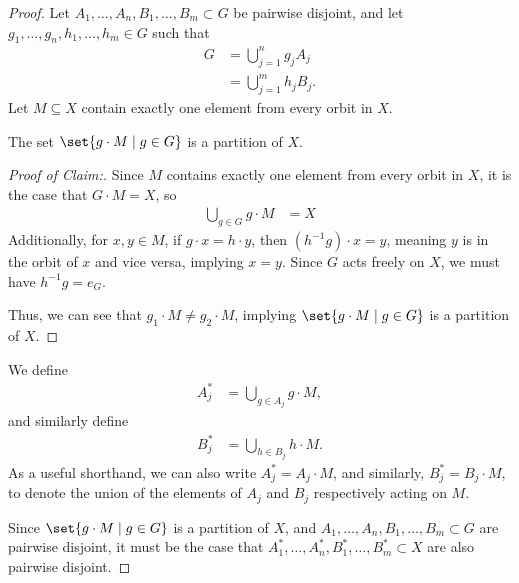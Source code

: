 \begin{proof}
  Let $A_1,\dots,A_n,B_1,\dots,B_m\subset G$ be pairwise disjoint, and let $g_1,\dots,g_n,h_1,\dots,h_m\in G$ such that
  \begin{align*}
    G &= \bigcup_{j=1}^{n}g_jA_j\\
      &= \bigcup_{j=1}^{m}h_jB_j.
  \end{align*}
  Let $M\subseteq X$ contain exactly one element from every orbit in $X$.
  \begin{claim}
  The set $\set{g\cdot M\mid g\in G}$ is a partition of $X$.
  \end{claim}
  \begin{proof}[Proof of Claim:]
  Since $M$ contains exactly one element from every orbit in $X$, it is the case that $G\cdot M = X$, so
  \begin{align*}
    \bigcup_{g\in G} g\cdot M &= X
  \end{align*}
  Additionally, for $x,y\in M$, if $g\cdot x = h\cdot y$, then $\left(h^{-1}g\right)\cdot x = y$, meaning $y$ is in the orbit of $x$ and vice versa, implying $x = y$. Since $G$ acts freely on $X$, we must have $h^{-1}g = e_G$.\newline

  Thus, we can see that $g_1\cdot M \neq g_2\cdot M$, implying $\set{g\cdot M\mid g\in G}$ is a partition of $X$.
  \end{proof}

  We define
  \begin{align*}
    A_j^{\ast} &= \bigcup_{g\in A_j}g\cdot M,
  \end{align*}
  and similarly define
  \begin{align*}
    B_j^{\ast} &= \bigcup_{h\in B_j}h\cdot M.
  \end{align*}
  As a useful shorthand, we can also write $A_j^{\ast} = A_j\cdot M$, and similarly, $B_j^{\ast} = B_j\cdot M$, to denote the union of the elements of $A_j$ and $B_j$ respectively acting on $M$.\newline

  Since $\set{g\cdot M\mid g\in G}$ is a partition of $X$, and $A_1,\dots,A_n,B_1,\dots,B_m\subset G$ are pairwise disjoint, it must be the case that $A_1^{\ast},\dots,A_n^{\ast},B_1^{\ast},\dots,B_m^{\ast}\subset X$ are also pairwise disjoint.\newline


\end{proof}

